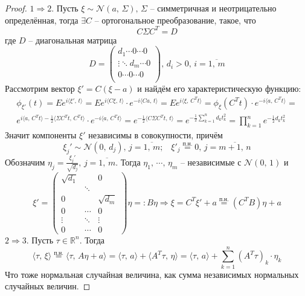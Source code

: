 \begin{proof}
	$1 \Rightarrow 2$. Пусть $\xi \sim \mathcal{N}(a,\, \Sigma),\, \Sigma$ -- симметричная и неотрицательно определённая, тогда $\exists C$ -- ортогональное преобразование, такое, что
	\[C\Sigma C^T = D\]
	где $D$ -- диагональная матрица
	\[
		D =
		\begin{pmatrix}
			d_1 \cdots 0 \cdots 0      \\
			\vdots \ddots d_m \cdots 0 \\
			0 \cdots 0 \cdots 0        \\
		\end{pmatrix},\, d_i > 0,\, i = \overline{1,\,m}
	\]
	Рассмотрим вектор $\xi' = C(\xi - a)$ и найдём его характеристическую функцию:
	\begin{align*}
		\phi_{\xi'}(t) = Ee^{i\langle\xi',\, t\rangle} = Ee^{i\langle C\xi,\,  t\rangle}\cdot e^{-i\langle Ca,\,t\rangle} = Ee^{i\langle\xi,\, C^Tt\rangle} = \phi_\xi(C^Tt)\cdot e^{-i\langle a,\, C^Tt\rangle} = \\
		e^{i\langle a,\, C^Tt\rangle - \frac{1}{2}\langle\Sigma C^T t,\, C^T t\rangle}\cdot e^{-i\langle a,\, C^Tt\rangle} = e^{-\frac{1}{2}\langle C\Sigma C^Tt,\, t\rangle} = e^{-\frac{1}{2}\sum_{k = 1}^n d_kt_k^2} = \prod_{k = 1}^n e^{-\frac{1}{2}d_kt_k^2}
	\end{align*}
	Значит компоненты $\xi'$ независимы в совокупности, причём
	\[\xi_j' \sim \mathcal{N}(0,\, d_j),\, j = \overline{1,\,m};\;\;\; \xi'_j \stackrel{\text{п.н.}}{=} 0,\, j = \overline{m + 1,\,n}\]
	Обозначим $\eta_j = \frac{\xi_j'}{\sqrt{d_j}},\, j = \overline{1,\,m}$. Тогда $\eta_1,\,\cdots,\,\eta_m$ -- независимые с $\mathcal{N}(0,\,1)$ и
	\[
		\xi' =
		\begin{pmatrix}
			\sqrt{d_1} &        & 0          \\
			           & \ddots &            \\
			0          &        & \sqrt{d_m} \\
			0          & \cdots & 0          \\
			\vdots     & \ddots & \vdots     \\
			0          & \cdots & 0
		\end{pmatrix}\eta =: B\eta \Rightarrow \xi = C^T\xi' + a \stackrel{\text{п.н.}}{=} (C^TB)\eta + a
	\]
	$2 \Rightarrow 3$. Пусть $\tau \in \mathbb{R}^n$. Тогда
	\[\langle\tau,\, \xi\rangle \stackrel{\text{п.н.}}{=} \langle\tau,\, A\eta + a\rangle = \langle\tau,\, a\rangle + \langle A^T\tau,\, \eta\rangle = \langle\tau,\, a\rangle + \sum_{k = 1}^n (A^T\tau)_k\cdot\eta_k\]
	Что тоже нормальная случайная величина, как сумма независимых нормальных случайных величин.


\end{proof}
